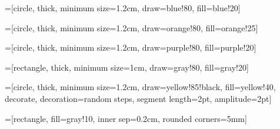 \documentclass[a4paper,10pt]{article}
\begin{document}
=[circle,
									thick,
									minimum size=1.2cm,
									draw=blue!80,
									fill=blue!20]

=[circle,
												thick,
												minimum size=1.2cm,
												draw=orange!80,
												fill=orange!25]

=[circle,
									thick,
									minimum size=1.2cm,
									draw=purple!80,
									fill=purple!20]

=[rectangle,
									thick,
									minimum size=1cm,
									draw=gray!80,
									fill=gray!20]

=[circle,
									thick,
									minimum size=1.2cm,
									draw=yellow!85!black,
									fill=yellow!40,
									decorate,
									decoration={random steps,
															segment length=2pt,
															amplitude=2pt}]

=[rectangle,
												fill=gray!10,
												inner sep=0.2cm,
												rounded corners=5mm]
\end{document}
